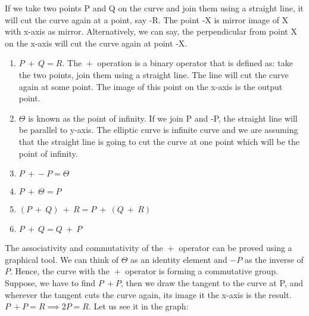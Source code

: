 \documentclass[11pt]{article}
\begin{document}
If we take two points P and Q on the curve and join them using a straight line, it will cut the curve again at a point, say -R. The point -X is mirror image of X with x-axis as mirror. Alternatively, we can say, the perpendicular from point X on the x-axis will cut the curve again at point -X.
\begin{enumerate}
    \item $P \  \boxed{+}  \ Q = R$. The $\boxed{+}$ operation is a binary operator that is defined as: take the two points, join them using a straight line. The line will cut the curve again at some point. The image of this point on the x-axis is the output point.
    \item $\Theta$ is known as the point of infinity. If we join P and -P, the straight line will be parallel to y-axis. The elliptic curve is infinite curve and we are assuming that the straight line is going to cut the curve at one point which will be the point of infinity.
    \item $P \ \boxed{+} -P = \Theta$
    \item ${P \ \boxed{+} \ \Theta = P}$
    \item $(P \ \boxed{+} \ Q) \ \boxed{+} \ R = P \ \boxed{+} \ (Q \ \boxed{+} \ R)$
    \item $P \ \boxed{+} \ Q = Q \ \boxed{+} \ P$
    
\end{enumerate}
The associativity and commutativity of the $\boxed{+}$ operator can be proved using a graphical tool. We can think of $\Theta$ as an identity element and $-P$ as the inverse of $P$. Hence, the curve with the $\boxed{+}$ operator is forming a commutative group.\\
\newline
Suppose, we have to find $P \ \boxed{+} P$, then we draw the tangent to the curve at P, and wherever the tangent cuts the curve again, its image it the x-axis is the result. $P \ \boxed{+} P = R \implies 2P = R$. Let us see it in the graph:
\end{document}
